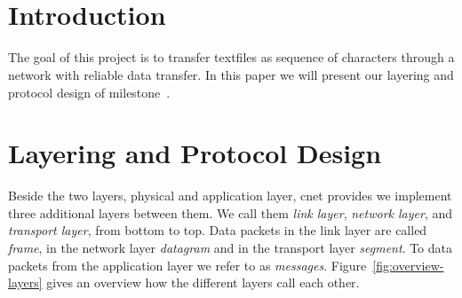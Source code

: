
\title{\Large \lecture \\ \textbf{\normalsize \assignment}}
\author{\authors}

\setlength \headheight{25pt}
\fancyhead[L]{\authors}




\maketitle

\section{Introduction}
The goal of this project is to transfer textfiles as sequence of characters through a network with reliable data transfer. In this paper we will present our layering and protocol design of milestone~.

\section{Layering and Protocol Design}

Beside the two layers, physical and application layer, cnet provides we implement three additional layers between them. We call them \emph{link layer}, \emph{network layer}, and \emph{transport layer}, from bottom to top. Data packets in the link layer are called \emph{frame}, in the network layer \emph{datagram} and in the transport layer \emph{segment}. To data packets from the application layer we refer to as \emph{messages}. Figure~\ref{fig:overview-layers} gives an overview how the different layers call each other.

